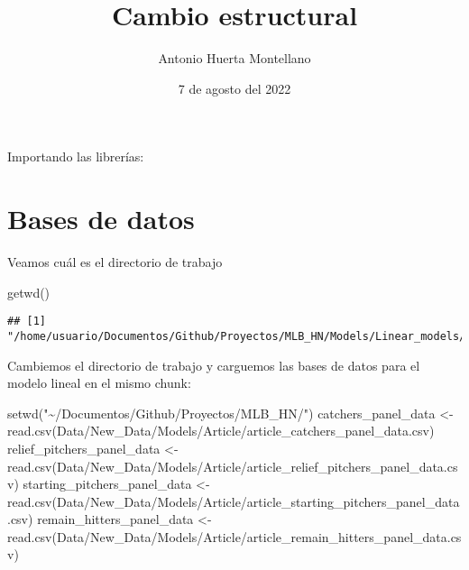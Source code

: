 \documentclass[
]{article}
\title{Cambio estructural}
\author{Antonio Huerta Montellano}
\date{7 de agosto del 2022}
\newenvironment{Shaded}{\begin{snugshade}}{\end{snugshade}}
\newcommand{\FunctionTok}[1]{\textcolor[rgb]{0.00,0.00,0.00}{#1}}
\newcommand{\NormalTok}[1]{#1}
\newcommand{\OtherTok}[1]{\textcolor[rgb]{0.56,0.35,0.01}{#1}}
\newcommand{\StringTok}[1]{\textcolor[rgb]{0.31,0.60,0.02}{#1}}
\begin{document}
\maketitle

Importando las librerías:

\section{Bases de datos}

Veamos cuál es el directorio de trabajo

\begin{Shaded}
\begin{Highlighting}[]
\FunctionTok{getwd}\NormalTok{()}
\end{Highlighting}
\end{Shaded}

\begin{verbatim}
## [1] "/home/usuario/Documentos/Github/Proyectos/MLB_HN/Models/Linear_models/Free_agent/Test"
\end{verbatim}

Cambiemos el directorio de trabajo y carguemos las bases de datos para
el modelo lineal en el mismo chunk:

\begin{Shaded}
\begin{Highlighting}[]
\FunctionTok{setwd}\NormalTok{(}\StringTok{"\textasciitilde{}/Documentos/Github/Proyectos/MLB\_HN/"}\NormalTok{)}
\NormalTok{catchers\_panel\_data }\OtherTok{\textless{}{-}} \FunctionTok{read.csv}\NormalTok{(}\StringTok{\textquotesingle{}Data/New\_Data/Models/Article/article\_catchers\_panel\_data.csv\textquotesingle{}}\NormalTok{)}
\NormalTok{relief\_pitchers\_panel\_data }\OtherTok{\textless{}{-}} \FunctionTok{read.csv}\NormalTok{(}\StringTok{\textquotesingle{}Data/New\_Data/Models/Article/article\_relief\_pitchers\_panel\_data.csv\textquotesingle{}}\NormalTok{)}
\NormalTok{starting\_pitchers\_panel\_data }\OtherTok{\textless{}{-}} \FunctionTok{read.csv}\NormalTok{(}\StringTok{\textquotesingle{}Data/New\_Data/Models/Article/article\_starting\_pitchers\_panel\_data.csv\textquotesingle{}}\NormalTok{)}
\NormalTok{remain\_hitters\_panel\_data }\OtherTok{\textless{}{-}} \FunctionTok{read.csv}\NormalTok{(}\StringTok{\textquotesingle{}Data/New\_Data/Models/Article/article\_remain\_hitters\_panel\_data.csv\textquotesingle{}}\NormalTok{)}
\end{Highlighting}
\end{Shaded}
\end{document}
